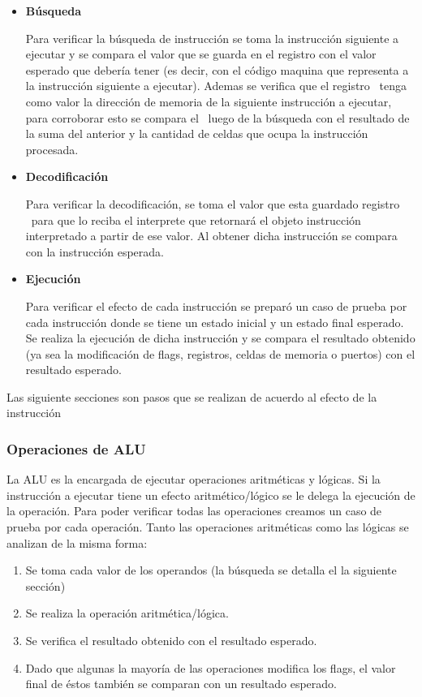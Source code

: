 \begin{itemize}
\item \textbf{Búsqueda} 

Para verificar la búsqueda de instrucción se toma la instrucción siguiente a ejecutar y se compara el valor que se guarda en el registro \IR con el valor esperado que debería tener (es decir, con el código maquina que representa a la instrucción siguiente a ejecutar). Ademas se verifica que el registro \PC\ tenga como valor la dirección de memoria de la siguiente instrucción a ejecutar, para corroborar esto se compara el \PC\ luego de la búsqueda con el resultado de la suma del \PC anterior y la cantidad de celdas que ocupa la instrucción procesada.

\item \textbf{Decodificación}

Para verificar la decodificación, se toma el valor que esta guardado registro \IR\ para que lo reciba el interprete que retornará el objeto instrucción interpretado a partir de ese valor. Al obtener dicha instrucción se compara con la instrucción esperada.
 
\item \textbf{Ejecución}

Para verificar el efecto de cada instrucción se preparó un caso de prueba por cada instrucción donde se tiene un estado inicial y un estado final esperado. Se realiza la ejecución de dicha instrucción y se compara el resultado obtenido (ya sea la modificación de flags, registros, celdas de memoria o puertos) con el resultado esperado. 

\end{itemize}

Las siguiente secciones son pasos que se realizan de acuerdo al efecto de la instrucción
  
\subsubsection{Operaciones de ALU}

La ALU es la encargada de ejecutar operaciones aritméticas y lógicas. Si la instrucción a ejecutar tiene un efecto aritmético/lógico se le delega la ejecución de la operación. Para poder verificar todas las operaciones creamos un caso de prueba por cada operación. Tanto las operaciones aritméticas como las lógicas se analizan de la misma forma:

\begin{enumerate}
\item Se toma cada valor de los operandos (la búsqueda se detalla el la siguiente sección)

\item Se realiza la operación aritmética/lógica. 

\item Se verifica el resultado obtenido con el resultado esperado.

\item Dado que algunas la mayoría de las operaciones modifica los flags, el valor final de éstos también se comparan con un resultado esperado. 
\end{enumerate}

